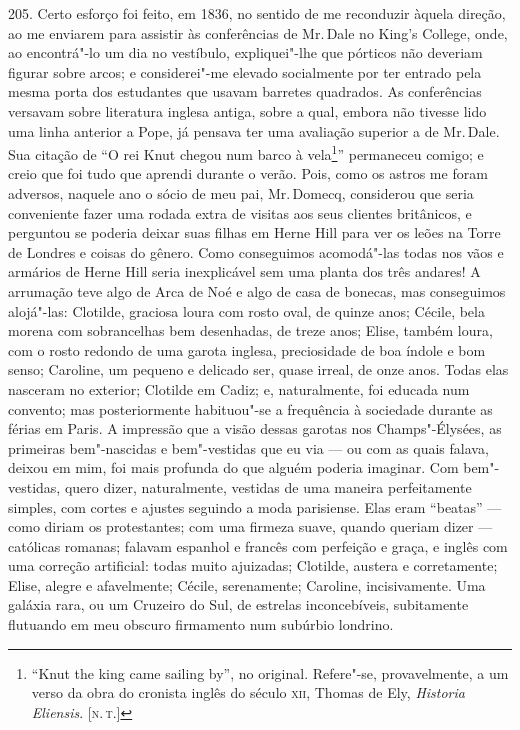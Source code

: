 205. Certo esforço foi feito, em 1836, no sentido de me reconduzir
àquela direção, ao me enviarem para assistir às conferências de Mr.\,Dale
no King's College, onde, ao encontrá"-lo um dia no vestíbulo,
expliquei"-lhe que pórticos não deveriam figurar sobre arcos; e
considerei"-me elevado socialmente por ter entrado pela mesma porta dos
estudantes que usavam barretes quadrados. As conferências versavam sobre
literatura inglesa antiga, sobre a qual, embora não tivesse lido uma
linha anterior a Pope, já pensava ter uma avaliação superior a de Mr.\,Dale. Sua citação de ``O rei Knut chegou num barco à vela\footnote{``Knut
  the king came sailing by'', no original. Refere"-se, provavelmente, a
  um verso da obra do cronista inglês do século \textsc{xii}, Thomas de Ely,
  \emph{Historia Eliensis}. {[}\textsc{n.\,t.}{]}}'' permaneceu comigo; e creio
que foi tudo que aprendi durante o verão. Pois, como os astros me foram
adversos, naquele ano o sócio de meu pai, Mr.\,Domecq, considerou que
seria conveniente fazer uma rodada extra de visitas aos seus clientes
britânicos, e perguntou se poderia deixar suas filhas em Herne Hill para
ver os leões na Torre de Londres e coisas do gênero. Como conseguimos
acomodá"-las todas nos vãos e armários de Herne Hill seria inexplicável
sem uma planta dos três andares! A arrumação teve algo de Arca de Noé e
algo de casa de bonecas, mas conseguimos alojá"-las: Clotilde, graciosa
loura com rosto oval, de quinze anos; Cécile, bela morena com
sobrancelhas bem desenhadas, de treze anos; Elise, também loura, com o
rosto redondo de uma garota inglesa, preciosidade de boa índole e bom
senso; Caroline, um pequeno e delicado ser, quase irreal, de onze anos.
Todas elas nasceram no exterior; Clotilde em Cadiz; e, naturalmente, foi
educada num convento; mas posteriormente habituou"-se a frequência à
sociedade durante as férias em Paris. A impressão que a visão dessas
garotas nos Champs"-Élysées, as primeiras bem"-nascidas e bem"-vestidas que
eu via --- ou com as quais falava, deixou em mim, foi mais profunda do
que alguém poderia imaginar. Com bem"-vestidas, quero dizer,
naturalmente, vestidas de uma maneira perfeitamente simples, com cortes
e ajustes seguindo a moda parisiense. Elas eram ``beatas'' --- como
diriam os protestantes; com uma firmeza suave, quando queriam dizer ---
católicas romanas; falavam espanhol e francês com perfeição e graça, e
inglês com uma correção artificial: todas muito ajuizadas; Clotilde,
austera e corretamente; Elise, alegre e afavelmente; Cécile,
serenamente; Caroline, incisivamente. Uma galáxia rara, ou um Cruzeiro
do Sul, de estrelas inconcebíveis, subitamente flutuando em meu obscuro
firmamento num subúrbio londrino.

